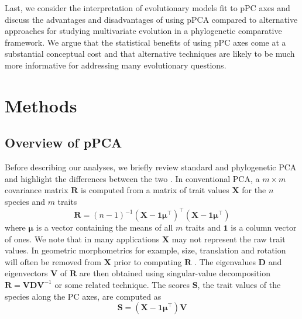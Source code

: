 \documentclass[a4paper,11pt]{article}
\begin{document}
Last, we consider the interpretation of evolutionary models fit to pPC axes and discuss the advantages and disadvantages of using pPCA compared to alternative approaches for studying multivariate evolution in a phylogenetic comparative framework. We argue that the statistical benefits of using pPC axes come at a substantial conceptual cost and that alternative techniques are likely to be much more informative for addressing many evolutionary questions.

\section{Methods}
\subsection{Overview of pPCA}
Before describing our analyses, we briefly review standard and phylogenetic PCA and highlight the differences between the two \citep[see][for a more detailed treatment]{Polly2013}. In conventional PCA, a $m \times m$ covariance matrix $\mathbf{R}$ is computed from a matrix of trait values $\mathbf{X}$ for the $n$ species and $m$ traits
\begin{equation}\label{eq:rpca}
\mathbf{R} = (n-1)^{-1}(\mathbf{X} - \mathbf{1}\boldsymbol{\mu}^\intercal)^\intercal (\mathbf{X} - \mathbf{1}\boldsymbol{\mu}^\intercal)
\end{equation}
where $\boldsymbol{\mu}$ is a vector containing the means of all $m$ traits and $\mathbf{1}$ is a column vector of ones. We note that in many applications $\mathbf{X}$ may not represent the raw trait values. In geometric morphometrics for example, size, translation and rotation will often be removed from $\mathbf{X}$ prior to computing $\mathbf{R}$ \citep{RohlfSlice, Bookstein1997}. The eigenvalues $\mathbf{D}$ and eigenvectors $\mathbf{V}$ of $\mathbf{R}$ are then obtained using singular-value decomposition $\mathbf{R}=\mathbf{V}\mathbf{D}\mathbf{V}^{-1}$ or some related technique. The scores $\mathbf{S}$, the trait values of the species along the PC axes, are computed as
\begin{equation}\label{eq:Spca}
\mathbf{S}=(\mathbf{X} - \mathbf{1}\boldsymbol{\mu}^\intercal)\mathbf{V}
\end{equation}
\end{document}
